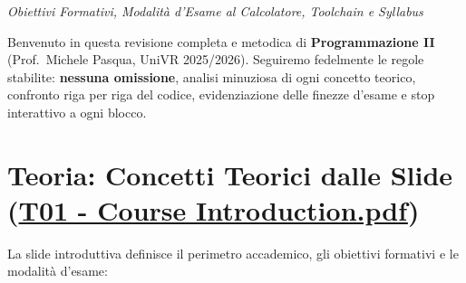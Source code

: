 \documentclass[11pt,a4paper,oneside]{report}
\begin{document}
{\small\sffamily\color{accentblue!80!black}\textit{Obiettivi Formativi, Modalità d'Esame al Calcolatore, Toolchain e Syllabus}}

\vspace{0.8em}

Benvenuto in questa revisione completa e metodica di
\textbf{Programmazione II} (Prof.~Michele Pasqua, UniVR 2025/2026).
Seguiremo fedelmente le regole stabilite: \textbf{nessuna omissione},
analisi minuziosa di ogni concetto teorico, confronto riga per riga del
codice, evidenziazione delle finezze d'esame e stop interattivo a ogni
blocco.

\section{\texorpdfstring{Teoria: Concetti Teorici dalle Slide
(\href{file:///home/wally/Documenti/GitHub/Programmazione-II/25-26/Teoria-e-Esercitazioni/Slides-20260902/T01\%20-\%20Course\%20Introduction.pdf}{T01
- Course
Introduction.pdf})}{Teoria: Concetti Teorici dalle Slide (T01 - Course Introduction.pdf)}}\label{chap01_teoria-concetti-teorici-dalle-slide-t01---course-introduction.pdf}

La slide introduttiva definisce il perimetro accademico, gli obiettivi
formativi e le modalità d'esame:
\end{document}
